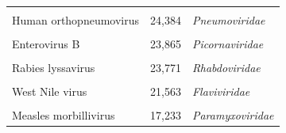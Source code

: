\documentclass[landscape]{slides}
\begin{document}
\begin{slide}
\begin{center}
\begin{tabular}{lrl}
& & \\
Human orthopneumovirus    &       24,384 & \emph{Pneumoviridae}    \\ %
& & \\
Enterovirus B             &       23,865 & \emph{Picornaviridae}   \\ %
& & \\
Rabies lyssavirus         &       23,771 & \emph{Rhabdoviridae}    \\ %
& & \\
West Nile virus           &       21,563 & \emph{Flaviviridae}     \\ %
& & \\
Measles morbillivirus     &       17,233 & \emph{Paramyxoviridae}  \\ %
\end{tabular}

\vfill

\end{center}
\end{slide}
\end{document}
